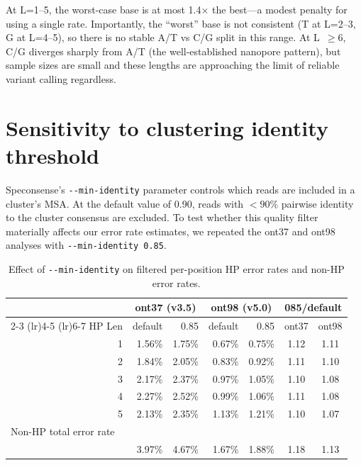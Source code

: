 \documentclass[11pt]{article}
\begin{document}
At L=1--5, the worst-case base is at most 1.4$\times$ the best---a modest
penalty for using a single rate. Importantly, the ``worst'' base is not
consistent (T at L=2--3, G at L=4--5), so there is no stable A/T vs C/G split
in this range. At L~$\geq 6$, C/G diverges sharply from A/T (the
well-established nanopore pattern), but sample sizes are small and these
lengths are approaching the limit of reliable variant calling regardless.


\section{Sensitivity to clustering identity threshold}
\label{sec:identity_sensitivity}

Speconsense's \texttt{-{}-min-identity} parameter controls which reads are
included in a cluster's MSA. At the default value of 0.90, reads with $<90\%$
pairwise identity to the cluster consensus are excluded. To test whether this
quality filter materially affects our error rate estimates, we repeated the
ont37 and ont98 analyses with \texttt{-{}-min-identity~0.85}.

\begin{table}[h]
\centering
\caption{Effect of \texttt{-{}-min-identity} on filtered per-position HP error
rates and non-HP error rates.}
\label{tab:identity_sensitivity}
\begin{tabular}{rrrrrcc}
\toprule
 & \multicolumn{2}{c}{ont37 (v3.5)} & \multicolumn{2}{c}{ont98 (v5.0)} & \multicolumn{2}{c}{085/default} \\
\cmidrule(lr){2-3} \cmidrule(lr){4-5} \cmidrule(lr){6-7}
HP Len & default & 0.85 & default & 0.85 & ont37 & ont98 \\
\midrule
1 & 1.56\% & 1.75\% & 0.67\% & 0.75\% & 1.12 & 1.11 \\
2 & 1.84\% & 2.05\% & 0.83\% & 0.92\% & 1.11 & 1.10 \\
3 & 2.17\% & 2.37\% & 0.97\% & 1.05\% & 1.10 & 1.08 \\
4 & 2.27\% & 2.52\% & 0.99\% & 1.06\% & 1.11 & 1.08 \\
5 & 2.13\% & 2.35\% & 1.13\% & 1.21\% & 1.10 & 1.07 \\
\midrule
\multicolumn{7}{l}{Non-HP total error rate} \\
 & 3.97\% & 4.67\% & 1.67\% & 1.88\% & 1.18 & 1.13 \\
\bottomrule
\end{tabular}
\end{table}
\end{document}
